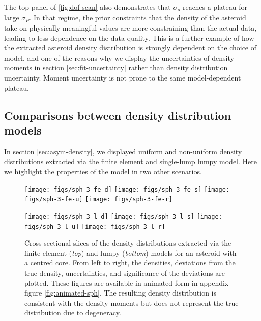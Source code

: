 \documentclass[fleqn,usenatbib]{mnras}
\begin{document}
The top panel of \ref{fig:dof-scan} also demonstrates that $\sigma_\rho$ reaches a plateau for large $\sigma_P$. In that regime, the prior constraints that the density of the asteroid take on physically meaningful values are more constraining than the actual data, leading to less dependence on the data quality. This is a further example of how the extracted asteroid density distribution is strongly dependent on the choice of model, and one of the reasons why we display the uncertainties of density moments in section \ref{sec:fit-uncertainty} rather than density distribution uncertainty. Moment uncertainty is not prone to the same model-dependent plateau.


\subsection{Comparisons between density distribution models}
\label{sec:density-compare}

In section \ref{sec:asym-density}, we displayed uniform and non-uniform density distributions extracted via the finite element and single-lump lumpy model. Here we highlight the properties of the model in two other scenarios.

\begin{figure}
  \texttt{[image: figs/sph-3-fe-d]}\hfill
  \texttt{[image: figs/sph-3-fe-s]}\hfill
  \texttt{[image: figs/sph-3-fe-u]}\hfill
  \texttt{[image: figs/sph-3-fe-r]}

  \texttt{[image: figs/sph-3-l-d]}\hfill
  \texttt{[image: figs/sph-3-l-s]}\hfill
  \texttt{[image: figs/sph-3-l-u]}\hfill
  \texttt{[image: figs/sph-3-l-r]}

  \caption{Cross-sectional slices of the density distributions extracted via the finite-element (\textit{top}) and lumpy (\textit{bottom}) models for an asteroid with a centred core. From left to right, the densities, deviations from the true density, uncertainties, and significance of the deviations are plotted. These figures are available in animated form in appendix figure \ref{fig:animated-sph}. The resulting density distribution is consistent with the density moments but does not represent the true distribution due to degeneracy.}
  \label{fig:den-sph}
\end{figure}
\end{document}
